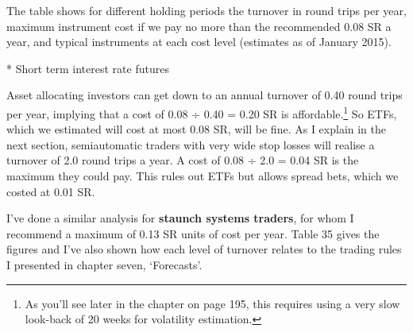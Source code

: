 The table shows for different holding periods the turnover in round trips per year, maximum instrument cost if we pay no more than the recommended 0.08 SR a year, and typical instruments at each cost level (estimates as of January 2015).

* Short term interest rate futures

Asset allocating investors can get down to an annual turnover of 0.40 round trips per year, implying that a cost of 0.08 ÷ 0.40 = 0.20 SR is affordable.\footnote{As you'll see later in the chapter on page 195, this requires using a very slow look-back of 20 weeks for volatility estimation.} So ETFs, which we estimated will cost at most 0.08 SR, will be fine. As I explain in the next section, semiautomatic traders with very wide stop losses will realise a turnover of 2.0 round trips a year. A cost of 0.08 ÷ 2.0 = 0.04 SR is the maximum they could pay. This rules out ETFs but allows spread bets, which we costed at 0.01 SR.

I've done a similar analysis for \textbf{staunch systems traders}, for whom I recommend a maximum of 0.13 SR units of cost per year. Table 35 gives the figures and I've also shown how each level of turnover relates to the trading rules I presented in chapter seven, ‘Forecasts'.

 

